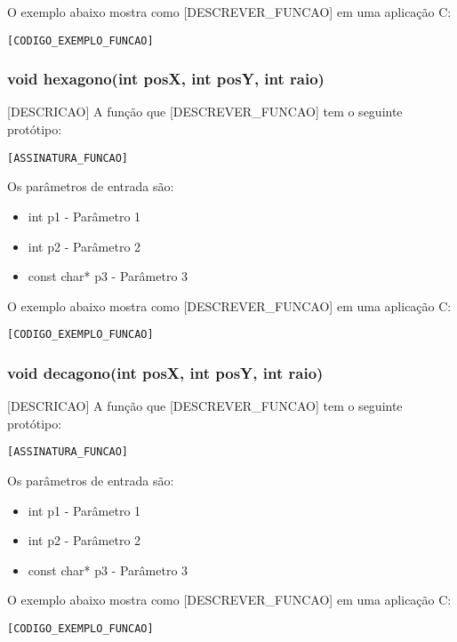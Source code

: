 \documentclass[12pt, %
openright,
oneside, %
a4paper,    %
brazil]{facom-ufu-abntex2}
\begin{document}
O exemplo abaixo mostra como [DESCREVER_FUNCAO] em uma aplicação C:

\begin{lstlisting}
[CODIGO_EXEMPLO_FUNCAO]
\end{lstlisting}

\subsubsection{void hexagono(int posX, int posY, int raio)}
[DESCRICAO]
A função que [DESCREVER_FUNCAO] tem o seguinte protótipo:

\begin{lstlisting}
[ASSINATURA_FUNCAO]
\end{lstlisting}

Os parâmetros de entrada são:

\begin{itemize}
    \item int p1 - Parâmetro 1
    \item int p2 - Parâmetro 2
    \item const char* p3 - Parâmetro 3
\end{itemize}

O exemplo abaixo mostra como [DESCREVER_FUNCAO] em uma aplicação C:

\begin{lstlisting}
[CODIGO_EXEMPLO_FUNCAO]
\end{lstlisting}

\subsubsection{void decagono(int posX, int posY, int raio)}
[DESCRICAO]
A função que [DESCREVER_FUNCAO] tem o seguinte protótipo:

\begin{lstlisting}
[ASSINATURA_FUNCAO]
\end{lstlisting}

Os parâmetros de entrada são:

\begin{itemize}
    \item int p1 - Parâmetro 1
    \item int p2 - Parâmetro 2
    \item const char* p3 - Parâmetro 3
\end{itemize}

O exemplo abaixo mostra como [DESCREVER_FUNCAO] em uma aplicação C:

\begin{lstlisting}
[CODIGO_EXEMPLO_FUNCAO]
\end{lstlisting}
\end{document}
